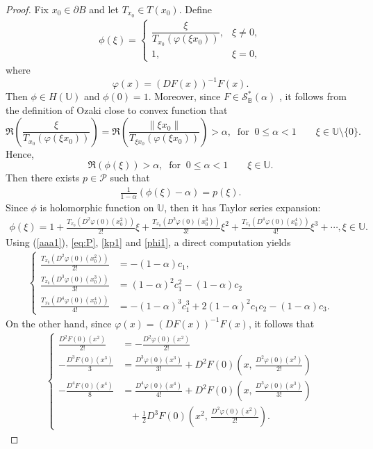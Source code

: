 \documentclass[10pt,a4paper]{amsart}
\newcommand{\bea}{\begin{eqnarray}}
\newcommand{\eea}{\end{eqnarray}}
\begin{document}
\begin{proof} Fix $x_0\in \partial B$ and let $T_{x_0}\in T(x_0)$. Define
\bea\label{aaa1}
\phi(\xi)=
\begin{cases}
\dfrac{\xi}{T_{x_0}\!\left(\varphi(\xi x_0)\right)}, & \xi\neq 0,\\[2mm]
1, & \xi=0,
\end{cases}
\eea
where
\[
\varphi(x)=(DF(x))^{-1}F(x).
\]
Then $\phi\in H(\mathbb U)$ and $\phi(0)=1$. Moreover, since
$F\in \mathcal{S}_{\mathbb{B}}^{*}(\alpha)$ , it follows from the definition of Ozaki close to convex function that
\[
\Re\!\left(\frac{\xi}{T_{x_0}\!\left(\varphi(\xi x_0)\right)}\right)
=
\Re\!\left(\frac{\|\xi x_0\|}{T_{\xi x_0}\!\left(\varphi(\xi x_0)\right)}\right)>\alpha,\;\;\text{for}\;\;0\leq \alpha < 1
\qquad \xi\in\mathbb U\setminus\{0\}.
\]
Hence,
\[\Re\!\left(\phi(\xi)\right)>\alpha,\;\;\text{for}\;\;0\leq \alpha < 1\qquad \xi\in\mathbb U.
\]
 Then there exists $p\in \mathcal{P}$ such that 
\bea\label{kp1}\frac{1}{1-\alpha}(\phi(\xi)-\alpha)=p(\xi).\eea
Since $\phi$ is holomorphic function on $\mathbb{U}$, then it has Taylor series expansion:
\bea\label{phi1}\phi(\xi)=1+\frac{T_{x_0}(D^2\varphi(0)(x_0^2))}{2!}\xi+\frac{T_{x_0}(D^3\varphi(0)(x_0^3))}{3!}\xi^2+\frac{T_{x_0}(D^4\varphi(0)(x_0^4))}{4!}\xi^3+\cdots,\xi\in \mathbb{U}.\eea
Using (\ref{aaa1}), \eqref{eq:P}, \eqref{kp1} and \eqref{phi1}, a direct computation yields
\bea\label{qq1}
\begin{cases} \frac{T_{x_0}(D^2\varphi(0)(x_0^2))}{2!}&=-(1-\alpha)c_1,\\
 \frac{T_{x_0}(D^3\varphi(0)(x_0^3))}{3!}&=(1-\alpha)^2 c_1^2-(1-\alpha)c_2\\
\frac{T_{x_0}(D^4\varphi(0)(x_0^4))}{4!}&=-(1-\alpha)^3 c_1^3+2(1-\alpha)^2 c_1c_2-(1-\alpha)c_3.
\end{cases}
\eea
On the other hand, since $\varphi(x)=(DF(x))^{-1}F(x)$, it follows that
\bea\label{qqq2}
\begin{cases}
\frac{D^{2}F(0)(x^{2})}{2!}&=-\frac{D^{2}\varphi(0)(x^{2})}{2!}\\
 -\frac{D^{3}F(0)(x^{3})}{3}&=\frac{D^{3}\varphi(0)(x^{3})}{3!}+D^{2}F(0)\!\left(x,\,\frac{D^{2}\varphi(0)(x^{2})}{2!}\right)\\
-\frac{D^{4}F(0)(x^{4})}{8}&=\frac{D^{4}\varphi(0)(x^{4})}{4!}+D^{2}F(0)\!\left(x,\,\frac{D^{3}\varphi(0)(x^{3})}{3!}\right)\\
&\;\;\;+\frac{1}{2}D^{3}F(0)\!\left(x^{2},\,\frac{D^{2}\varphi(0)(x^{2})}{2!}\right).
\end{cases}\eea


\end{proof}
\end{document}
